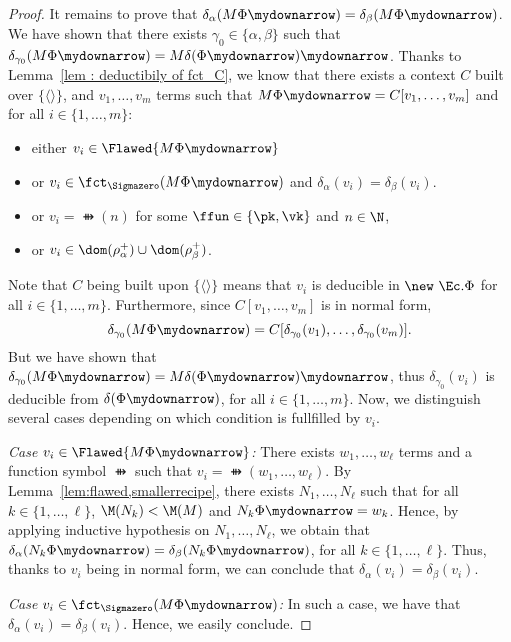 \begin{proof}
It remains to prove that $\delta_\alpha(M\Phi\mydownarrow) =
\delta_\beta(M\Phi\mydownarrow)$. We have shown that there exists $\gamma_0 \in \{\alpha,\beta\}$
such that $\delta_{\gamma_0}(M\Phi\mydownarrow) =
M\delta(\Phi\mydownarrow)\mydownarrow$. Thanks to Lemma~\ref{lem : deductibily of fct_C},
we know that there exists a context $C$ built over $\{ \langle\rangle\}$, and
$v_1, \ldots, v_m$ terms such that $M\Phi\mydownarrow = C[v_1, \ldots, v_m]$ and
for all $i \in \{1, \ldots, m\}$:
\begin{itemize}
\item either $v_i \in \Flawed{M\Phi\mydownarrow}$
\item or $v_i \in \fct_{\Sigmazero}(M\Phi\mydownarrow)$ and $\delta_\alpha(v_i) = \delta_\beta(v_i)$.
\item or $v_i = \ffun(n)$ for some $\ffun \in \{\pk, \vk\}$ and $n \in \N$,
\item or $v_i \in \dom(\rho^+_\alpha) \cup \dom(\rho^+_\beta)$.
\end{itemize}

Note that $C$ being built upon $\{ \langle \rangle \}$ means that
$v_i$ is deducible in $\new\ \Ec. \Phi$ for all $i \in \{1, \ldots, m\}$. Furthermore,
since $C[v_1, \ldots, v_m]$ is in normal form,
\[
\delta_{\gamma_0}(M\Phi\mydownarrow) = C[\delta_{\gamma_0}(v_1),\ldots,
\delta_{\gamma_0}(v_m)].
\]
But we have shown that
$\delta_{\gamma_0}(M\Phi\mydownarrow) = M\delta(\Phi\mydownarrow)\mydownarrow$, thus
$\delta_{\gamma_0}(v_i)$ is deducible from $\delta(\Phi\mydownarrow)$, for all $i \in
\{1, \ldots, m\}$. Now, we distinguish several cases depending on
which condition is fullfilled by $v_i$.
\smallskip{}

\emph{Case $v_i \in \Flawed{M\Phi\mydownarrow}$:} There exists $w_1, \ldots,
w_\ell$ terms and a function symbol $\ffun$ such that $v_i = \ffun(w_1, \ldots,
w_\ell)$. By Lemma~\ref{lem:flawed,smallerrecipe}, there exists $N_1,
\ldots, N_\ell$ such that for all $k \in \{1, \ldots, \ell\}$, $\M(N_k) < \M(M)$
and $N_k\Phi\mydownarrow = w_k$. Hence, by applying inductive hypothesis on
$N_1, \ldots, N_\ell$, we obtain that $\delta_\alpha(N_k\Phi\mydownarrow) =
\delta_\beta(N_k\Phi\mydownarrow)$, for all $k \in \{1, \ldots, \ell\}$. Thus,
thanks to $v_i$ being in normal form, we can conclude that $\delta_\alpha(v_i) =
\delta_\beta(v_i)$.

\smallskip{}

\emph{Case $v_i \in \fct_{\Sigmazero}(M\Phi\mydownarrow)$:} In
  such a case, we have that 
$\delta_\alpha(v_i) = \delta_\beta(v_i)$. Hence, we easily conclude.


\end{proof}
